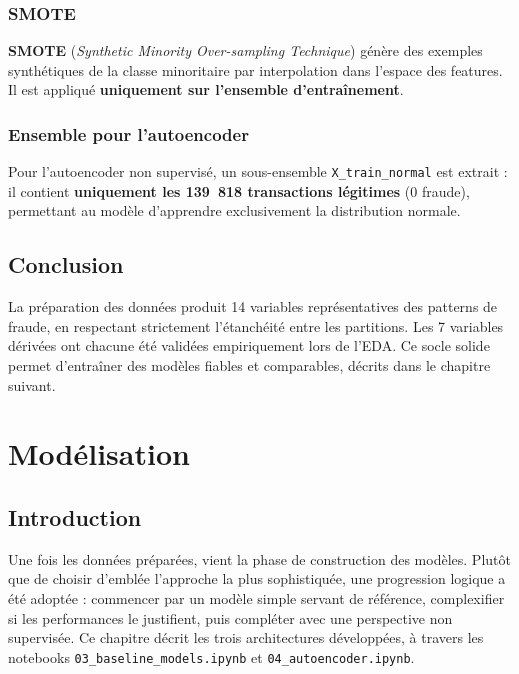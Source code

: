\documentclass[12pt,a4paper,twoside]{report}
\begin{document}
\subsection{SMOTE}

\textbf{SMOTE} (\textit{Synthetic Minority Over-sampling Technique}) génère des exemples synthétiques de la classe minoritaire par interpolation dans l'espace des features. Il est appliqué \textbf{uniquement sur l'ensemble d'entraînement}.

\subsection{Ensemble pour l'autoencoder}

Pour l'autoencoder non supervisé, un sous-ensemble \texttt{X\_train\_normal} est extrait : il contient \textbf{uniquement les 139~818 transactions légitimes} (0 fraude), permettant au modèle d'apprendre exclusivement la distribution normale.

\section*{Conclusion}

La préparation des données produit 14 variables représentatives des patterns de fraude, en respectant strictement l'étanchéité entre les partitions. Les 7 variables dérivées ont chacune été validées empiriquement lors de l'EDA. Ce socle solide permet d'entraîner des modèles fiables et comparables, décrits dans le chapitre suivant.

\chapter{Modélisation}

\section{Introduction}

Une fois les données préparées, vient la phase de construction des modèles. Plutôt que de choisir d'emblée l'approche la plus sophistiquée, une progression logique a été adoptée : commencer par un modèle simple servant de référence, complexifier si les performances le justifient, puis compléter avec une perspective non supervisée. Ce chapitre décrit les trois architectures développées, à travers les notebooks \texttt{03\_baseline\_models.ipynb} et \texttt{04\_autoencoder.ipynb}.
\end{document}

